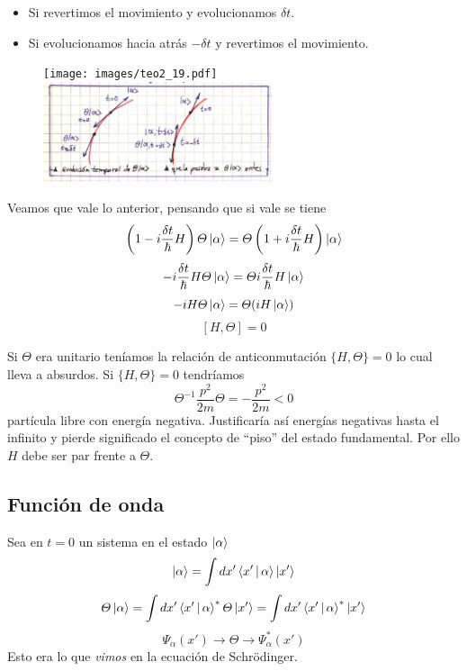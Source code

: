 \documentclass[10pt,oneside]{CBFT_book}
\begin{document}
\begin{itemize}
 \item Si revertimos el movimiento y evolucionamos $\delta t$.
 \item Si evolucionamos hacia atrás $-\delta t$ y revertimos el movimiento.
\end{itemize}
\begin{figure}[htb]
	\texttt{[image: images/teo2\_19.pdf]}
	\includegraphics[width=0.6\textwidth]{images/fig_ft2_temporal_2.jpg}
	\caption{}
\end{figure} 
Veamos que vale lo anterior, pensando que si vale se tiene 
\[
	\left( 1- i\frac{\delta t}{\hbar} H\right) \Theta \Ket{\alpha} =
	\Theta \left( 1 + i\frac{\delta t}{\hbar} H \right) \Ket{\alpha}
\]
\[
	- i\frac{\delta t}{\hbar} H \Theta \Ket{\alpha} =  \Theta
	i\frac{\delta t}{\hbar} H \Ket{\alpha} 
\]
\[
	- i H\Theta \Ket{\alpha} = \Theta (i H \Ket{\alpha} )
\]
\[
	[H,\Theta] = 0
\]

Si $\Theta$ era unitario teníamos la relación de anticonmutación $\{ H, \Theta \}=0$ 
lo cual lleva a absurdos.
Si $\{ H,\Theta \} = 0$ tendríamos
\[
	\Theta^{-1} \frac{p^2}{2m} \Theta = - \frac{p^2}{2m} < 0
\]
partícula libre con energía negativa. Justificaría así energías negativas hasta el infinito
y pierde significado el concepto de ``piso'' del estado fundamental.
Por ello $H$ debe ser par frente a $\Theta$.

\subsection{Función de onda}

Sea en $t=0$ un sistema en el estado $\Ket{\alpha}$
\[
	\Ket{\alpha} = \int dx' \Braket{x'|\alpha} \Ket{x'} 
\]
\[
	\Theta\Ket{\alpha} = \int dx' \Braket{x'|\alpha}^* \Theta \Ket{x'} =
	\int dx' \Braket{x'|\alpha}^* \Ket{x'} 
\]
\[
	\Psi_\alpha (x') \longrightarrow \Theta \longrightarrow \Psi_\alpha^* (x')
\]
Esto era lo que {\it vimos} en la ecuación de Schrödinger.
\end{document}
